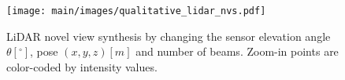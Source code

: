 \begin{figure}[t]
\centering
\texttt{[image: main/images/qualitative\_lidar\_nvs.pdf]}
\caption{LiDAR novel view synthesis by changing the sensor elevation angle $\theta [^{\circ}]$, pose $(x, y, z) [m]$ and number of beams. Zoom-in points are color-coded by intensity values.}
\label{fig:iccv_lidar_nvs}
\end{figure}